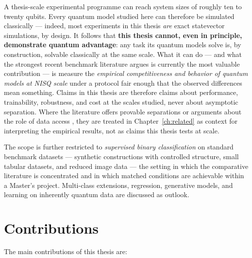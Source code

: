 A thesis-scale experimental programme can reach system sizes of roughly ten to
twenty qubits. Every quantum model studied here can therefore be simulated
classically --- indeed, most experiments in this thesis \emph{are} exact
statevector simulations, by design. It follows that \textbf{this thesis cannot,
even in principle, demonstrate quantum advantage}: any task its quantum models
solve is, by construction, solvable classically at the same scale. What it can
do --- and what the strongest recent benchmark literature argues is currently
the most valuable contribution \citep{bowles2024better, schnabel2025scrutiny}
--- is measure the \emph{empirical competitiveness and behavior of quantum
models at NISQ scale} under a protocol fair enough that the observed
differences mean something. Claims in this thesis are therefore claims about
performance, trainability, robustness, and cost at the scales studied, never
about asymptotic separation. Where the literature offers provable separations
\citep{liu2021rigorous} or arguments about the role of data access
\citep{huang2021power}, they are treated in Chapter~\ref{ch:related} as context
for interpreting the empirical results, not as claims this thesis tests at
scale.

The scope is further restricted to \emph{supervised binary classification} on
standard benchmark datasets --- synthetic constructions with controlled
structure, small tabular datasets, and reduced image data --- the setting in
which the comparative literature is concentrated and in which matched
conditions are achievable within a Master's project. Multi-class extensions,
regression, generative models, and learning on inherently quantum data are
discussed as outlook.

\section{Contributions}
\label{sec:intro-contributions}

The main contributions of this thesis are:


